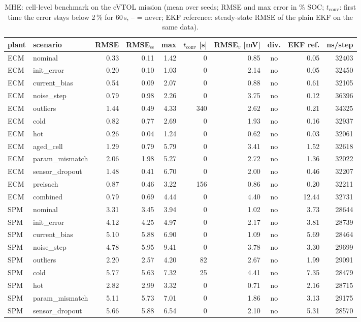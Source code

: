 \begin{table}[H]\centering\footnotesize\setlength{\tabcolsep}{4pt}
\caption{MHE: cell-level benchmark on the eVTOL mission (mean over seeds; RMSE and max error in \% SOC; $t_\mathrm{conv}$: first time the error stays below 2\,\% for 60\,s, -- = never; EKF reference: steady-state RMSE of the plain EKF on the same data).}\label{tab:cell_MHE}
\begin{tabular}{llrrrrrcrr}\toprule
plant & scenario & RMSE & RMSE$_\mathrm{ss}$ & max & $t_\mathrm{conv}$ [s] & RMSE$_v$ [mV] & div. & EKF ref. & ns/step \\ \midrule
ECM & nominal & 0.33 & 0.11 & 1.42 & 0 & 0.85 & no & 0.05 & 32403 \\
ECM & init\_error & 0.20 & 0.10 & 1.03 & 0 & 2.14 & no & 0.05 & 32450 \\
ECM & current\_bias & 0.54 & 0.09 & 2.07 & 0 & 0.88 & no & 0.61 & 32105 \\
ECM & noise\_step & 0.79 & 0.98 & 2.26 & 0 & 3.75 & no & 0.12 & 36396 \\
ECM & outliers & 1.44 & 0.49 & 4.33 & 340 & 2.62 & no & 0.21 & 34325 \\
ECM & cold & 0.82 & 0.77 & 2.69 & 0 & 1.93 & no & 0.16 & 32937 \\
ECM & hot & 0.26 & 0.04 & 1.24 & 0 & 0.62 & no & 0.03 & 32061 \\
ECM & aged\_cell & 1.29 & 0.79 & 5.79 & 0 & 3.41 & no & 1.52 & 32618 \\
ECM & param\_mismatch & 2.06 & 1.98 & 5.27 & 0 & 2.72 & no & 1.36 & 32022 \\
ECM & sensor\_dropout & 1.48 & 0.41 & 6.70 & 0 & 2.00 & no & 0.46 & 32207 \\
ECM & preisach & 0.87 & 0.46 & 3.22 & 156 & 0.86 & no & 0.20 & 32211 \\
ECM & combined & 0.79 & 0.69 & 4.44 & 0 & 4.40 & no & 12.44 & 32731 \\
\midrule
SPM & nominal & 3.31 & 3.45 & 3.94 & 0 & 1.02 & no & 3.73 & 28644 \\
SPM & init\_error & 4.12 & 4.25 & 4.97 & 0 & 2.17 & no & 3.81 & 28739 \\
SPM & current\_bias & 5.10 & 5.88 & 6.90 & 0 & 1.09 & no & 5.69 & 28464 \\
SPM & noise\_step & 4.78 & 5.95 & 9.41 & 0 & 3.78 & no & 3.30 & 29699 \\
SPM & outliers & 2.20 & 2.57 & 4.20 & 82 & 2.67 & no & 1.99 & 29091 \\
SPM & cold & 5.77 & 5.63 & 7.32 & 25 & 4.41 & no & 7.35 & 28479 \\
SPM & hot & 2.82 & 2.99 & 3.32 & 0 & 0.71 & no & 2.16 & 28715 \\
SPM & param\_mismatch & 5.11 & 5.73 & 7.01 & 0 & 1.86 & no & 3.13 & 29175 \\
SPM & sensor\_dropout & 5.66 & 5.88 & 6.54 & 0 & 2.10 & no & 5.31 & 28570 \\
\bottomrule\end{tabular}\end{table}
